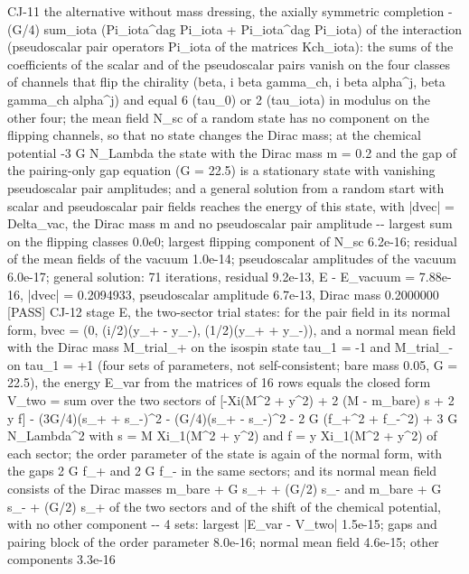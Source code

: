 \documentclass[
  10pt,
]{article}
\newenvironment{Shaded}{}{}
\newcommand{\NormalTok}[1]{#1}
\begin{document}
\begin{Shaded}
\begin{Highlighting}[]
\NormalTok{[PASS] CJ{-}11  the alternative without mass dressing, the axially symmetric completion {-}(G/4) sum\_iota (Pi\_iota\^{}dag Pi\_iota + Pi\textquotesingle{}\_iota\^{}dag Pi\textquotesingle{}\_iota) of the interaction (pseudoscalar pair operators Pi\textquotesingle{}\_iota of the matrices Kch\textquotesingle{}\_iota): the sums of the coefficients of the scalar and of the pseudoscalar pairs vanish on the four classes of channels that flip the chirality (beta, i beta gamma\_ch, i beta alpha\^{}j, beta gamma\_ch alpha\^{}j) and equal 6 (tau\_0) or 2 (tau\_iota) in modulus on the other four; the mean field N\_sc of a random state has no component on the flipping channels, so that no state changes the Dirac mass; at the chemical potential {-}3 G N\_Lambda the state with the Dirac mass m = 0.2 and the gap of the pairing{-}only gap equation (G = 22.5) is a stationary state with vanishing pseudoscalar pair amplitudes; and a general solution from a random start with scalar and pseudoscalar pair fields reaches the energy of this state, with |dvec| = Delta\_vac, the Dirac mass m and no pseudoscalar pair amplitude  {-}{-} largest sum on the flipping classes 0.0e0; largest flipping component of N\_sc 6.2e{-}16; residual of the mean fields of the vacuum 1.0e{-}14; pseudoscalar amplitudes of the vacuum 6.0e{-}17; general solution: 71 iterations, residual 9.2e{-}13, E {-} E\_vacuum = 7.88e{-}16, |dvec| = 0.2094933, pseudoscalar amplitude 6.7e{-}13, Dirac mass 0.2000000}
\NormalTok{[PASS] CJ{-}12  stage E, the two{-}sector trial states: for the pair field in its normal form, bvec = (0, (i/2)(y\_+ {-} y\_{-}), (1/2)(y\_+ + y\_{-})), and a normal mean field with the Dirac mass M\_trial\_+ on the isospin state tau\_1 = {-}1 and M\_trial\_{-} on tau\_1 = +1 (four sets of parameters, not self{-}consistent; bare mass 0.05, G = 22.5), the energy E\_var from the matrices of 16 rows equals the closed form V\_two = sum over the two sectors of [{-}Xi(M\^{}2 + y\^{}2) + 2 (M {-} m\_bare) s + 2 y f] {-} (3G/4)(s\_+ + s\_{-})\^{}2 {-} (G/4)(s\_+ {-} s\_{-})\^{}2 {-} 2 G (f\_+\^{}2 + f\_{-}\^{}2) + 3 G N\_Lambda\^{}2 with s = M Xi\_1(M\^{}2 + y\^{}2) and f = y Xi\_1(M\^{}2 + y\^{}2) of each sector; the order parameter of the state is again of the normal form, with the gaps 2 G f\_+ and 2 G f\_{-} in the same sectors; and its normal mean field consists of the Dirac masses m\_bare + G s\_+ + (G/2) s\_{-} and m\_bare + G s\_{-} + (G/2) s\_+ of the two sectors and of the shift of the chemical potential, with no other component  {-}{-} 4 sets: largest |E\_var {-} V\_two| 1.5e{-}15; gaps and pairing block of the order parameter 8.0e{-}16; normal mean field 4.6e{-}15; other components 3.3e{-}16}

\end{Highlighting}
\end{Shaded}
\end{document}

